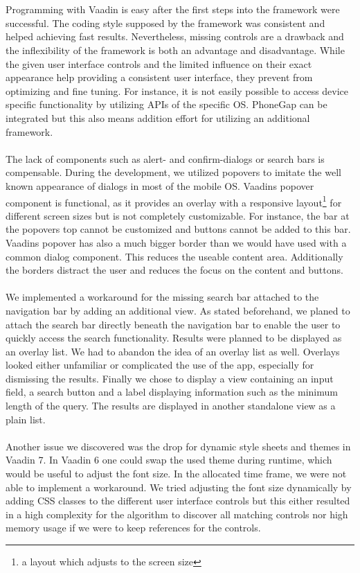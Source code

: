 \\
\\
Programming with Vaadin is easy after the first steps into the framework were successful. The coding style supposed by the framework was consistent and helped achieving fast results. Nevertheless, missing controls are a drawback and the inflexibility of the framework is both an advantage and disadvantage. While the given user interface controls and the limited influence on their exact appearance help providing a consistent user interface, they prevent from optimizing and fine tuning. For instance, it is not easily possible to access device specific functionality by utilizing APIs of the specific OS. PhoneGap can be integrated but this also means addition effort for utilizing an additional framework.
\\
\\
The lack of components such as alert- and confirm-dialogs or search bars is compensable. During the development, we utilized popovers to imitate the well known appearance of dialogs in most of the mobile OS. Vaadins popover component is functional, as it provides an overlay with a responsive layout\footnote{a layout which adjusts to the screen size} for different screen sizes but is not completely customizable. For instance, the bar at the popovers top cannot be customized and buttons cannot be added to this bar. Vaadins popover has also a much bigger border than we would have used with a common dialog component. This reduces the useable content area. Additionally the borders distract the user and reduces the focus on the content and buttons.
\\
\\
We implemented a workaround for the missing search bar attached to the navigation bar by adding an additional view. As stated beforehand, we planed to attach the search bar directly beneath the navigation bar to enable the user to quickly access the search functionality. Results were planned to be displayed as an overlay list. We had to abandon the idea of an overlay list as well. Overlays looked either unfamiliar or complicated the use of the app, especially for dismissing the results. Finally we chose to display a view containing an input field, a search button and a label displaying information such as the minimum length of the query. The results are displayed in another standalone view as a plain list.
\\
\\
Another issue we discovered was the drop for dynamic style sheets and themes in Vaadin 7. In Vaadin 6 one could swap the used theme during runtime, which would be useful to adjust the font size. In the allocated time frame, we were not able to implement a workaround. We tried adjusting the font size dynamically by adding CSS classes to the different user interface controls but this either resulted in a high complexity for the algorithm to discover all matching controls nor high memory usage if we were to keep references for the controls.
